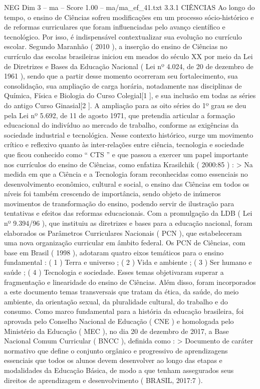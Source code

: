 \begin{textsample}{NEG Dim 3 – ma – Score 1.00 – ma/ma\_ef\_41.txt}  \label{ex:f3_neg_144}
3.3.1 CIÊNCIAS Ao longo do tempo, o ensino de Ciências sofreu modificações em um processo sócio-histórico e de reformas curriculares que foram influenciadas pelo avanço científico e tecnológico.
Por isso, é indispensável contextualizar sua evolução no currículo escolar.
Segundo Maranhão ( 2010 ), a inserção do ensino de Ciências no currículo das escolas brasileiras iniciou em meados do século XX por meio da Lei de Diretrizes e Bases da Educação Nacional ( Lei nº 4.024, de 20 de dezembro de 1961 ), sendo que a partir desse momento ocorreram seu fortalecimento, sua consolidação, sua ampliação de carga horária, notadamente nas disciplinas de Química, Física e Biologia do Curso Colegial[1 ], e sua inclusão em todas as séries do antigo Curso Ginasial[2 ].
A ampliação para as oito séries do 1º grau se deu pela Lei nº 5.692, de 11 de agosto 1971, que pretendia articular a formação educacional do indivíduo ao mercado de trabalho, conforme as exigências da sociedade industrial e tecnológica.
Nesse contexto histórico, surge um movimento crítico e reflexivo quanto às inter-relações entre ciência, tecnologia e sociedade que ficou conhecido como “ CTS ” e que passou a exercer um papel importante nos currículos do ensino de Ciências, como enfatiza Krasilchik ( 2000:85 ) : > Na medida em que a Ciência e a Tecnologia foram reconhecidas como essenciais no desenvolvimento econômico, cultural e social, o ensino das Ciências em todos os níveis foi também crescendo de importância, sendo objeto de inúmeros movimentos de transformação do ensino, podendo servir de ilustração para tentativas e efeitos das reformas educacionais.
Com a promulgação da LDB ( Lei nº 9.394/96 ), que instituiu as diretrizes e bases para a educação nacional, foram elaborados os Parâmetros Curriculares Nacionais ( PCN ), que estabeleceram uma nova organização curricular em âmbito federal.
Os PCN de Ciências, com base em Brasil ( 1998 ), adotaram quatro eixos temáticos para o ensino fundamental : ( 1 ) Terra e universo ; ( 2 ) Vida e ambiente ; ( 3 ) Ser humano e saúde ; ( 4 ) Tecnologia e sociedade.
Esses temas objetivaram superar a fragmentação e linearidade do ensino de Ciências.
Além disso, foram incorporados a este documento temas transversais que tratam da ética, da saúde, do meio ambiente, da orientação sexual, da pluralidade cultural, do trabalho e do consumo.
Como marco fundamental para a história da educação brasileira, foi aprovada pelo Conselho Nacional de Educação ( CNE ) e homologada pelo Ministério da Educação ( MEC ), no dia 20 de dezembro de 2017, a Base Nacional Comum Curricular ( BNCC ), definida como : > Documento de caráter normativo que define o conjunto orgânico e progressivo de aprendizagens essenciais que todos os alunos devem desenvolver ao longo das etapas e modalidades da Educação Básica, de modo a que tenham assegurados seus direitos de aprendizagem e desenvolvimento ( BRASIL, 2017:7 ).

\end{textsample}
